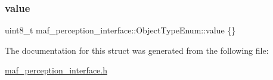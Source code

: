 \subsubsection{\texorpdfstring{value}{value}}
{\footnotesize\ttfamily uint8\+\_\+t maf\+\_\+perception\+\_\+interface\+::\+Object\+Type\+Enum\+::value \{\}}



The documentation for this struct was generated from the following file\+:\begin{DoxyCompactItemize}
\item 
\hyperlink{maf__perception__interface_8h}{maf\+\_\+perception\+\_\+interface.\+h}\end{DoxyCompactItemize}
